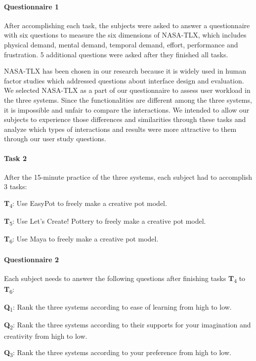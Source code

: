 \documentclass{svjour3}                     %
\begin{document}
\paragraph{Questionnaire 1} After accomplishing each task, the subjects were asked to answer a questionnaire with six questions to measure the six dimensions of NASA-TLX, which includes physical demand, mental demand, temporal demand, effort, performance and frustration. 5 additional questions were asked after they finished all tasks.

NASA-TLX has been chosen in our research because it is widely used in human factor studies which addressed questions about interface design and evaluation.\cite{hart2006nasa} We selected NASA-TLX as a part of our questionnaire to assess user workload in the three systems. Since the functionalities are different among the three systems, it is impossible and unfair to compare the interactions. We intended to allow our subjects to experience those differences and similarities through these tasks and analyze which types of interactions and results were more attractive to them through our user study questions.

\paragraph{Task 2} After the 15-minute practice of the three systems, each subject had to accomplish 3 tasks:

\textbf{T}\textsubscript{4}: Use EasyPot to freely make a creative pot model.

\textbf{T}\textsubscript{5}: Use Let's Create! Pottery to freely make a creative pot model.

\textbf{T}\textsubscript{6}: Use Maya to freely make a creative pot model.

\paragraph{Questionnaire 2} Each subject needs to answer the following questions after finishing tasks \textbf{T}\textsubscript{4} to \textbf{T}\textsubscript{6}:

\textbf{Q}\textsubscript{1}: Rank the three systems according to ease of learning from high to low.

\textbf{Q}\textsubscript{2}: Rank the three systems according to their supports for your imagination and creativity from high to low.

\textbf{Q}\textsubscript{3}: Rank the three systems according to your preference from high to low.
\end{document}

